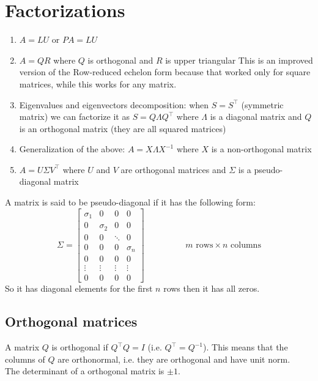 \section{Factorizations}
\begin{enumerate}
    \item $A = LU$ or $PA = LU$
    \item $A = QR$ where $Q$ is orthogonal and $R$ is upper triangular
    This is an improved version of the Row-reduced echelon form because that worked only for square matrices, while this works for any matrix.
    \item Eigenvalues and eigenvectors decomposition: when $S = S^\intercal$ (symmetric matrix) we can factorize it as $S = Q\Lambda Q^\intercal$ where $\Lambda$ is a diagonal matrix and $Q$ is an orthogonal matrix (they are all squared matrices)
    \item Generalization of the above: $A = X\Lambda X^{-1}$ where $X$ is a non-orthogonal matrix
    \item $A = U\Sigma V^\intercal$ where $U$ and $V$ are orthogonal matrices and $\Sigma$ is a pseudo-diagonal matrix
\end{enumerate}
A matrix is said to be pseudo-diagonal if it has the following form:
\[
    \Sigma = 
    \begin{bmatrix}
        \sigma_1 & 0 & 0 & 0\\
        0 & \sigma_2 & 0 & 0\\
        0 & 0 & \ddots & 0\\
        0 & 0 & 0 & \sigma_n\\
        0 & 0 & 0 & 0\\
        \vdots & \vdots & \vdots & \vdots\\
        0 & 0 & 0 & 0
    \end{bmatrix}
    \hspace{2cm}
    m \text{ rows} \times n \text{ columns}
\]
So it has diagonal elements for the first $n$ rows then it has all zeros.

\subsection*{Orthogonal matrices}
A matrix $Q$ is orthogonal if $Q^\intercal Q = I$ (i.e. $Q^\intercal = Q^{-1}$). This means that the columns of $Q$ are orthonormal, i.e. they are orthogonal and have unit norm.\\

The determinant of a orthogonal matrix is $\pm 1$.

